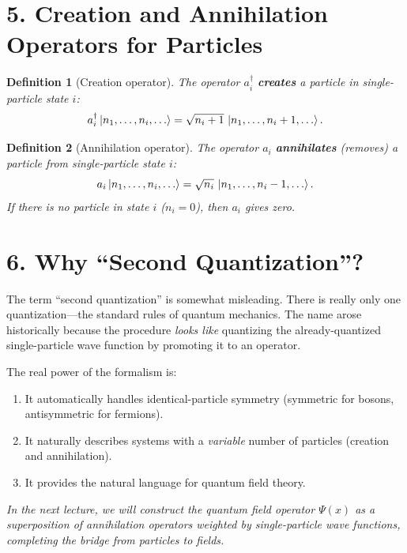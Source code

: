 \documentclass[12pt,a4paper]{article}
\newtheorem{definition}{Definition}
\begin{document}
\section{5. Creation and Annihilation Operators for Particles}

\begin{definition}[Creation operator]
The operator $a_i^\dagger$ \textbf{creates} a particle in single-particle state $i$:
\[
    a_i^\dagger\ket{n_1, \ldots, n_i, \ldots} = \sqrt{n_i + 1}\,\ket{n_1, \ldots, n_i + 1, \ldots}.
\]
\end{definition}

\begin{definition}[Annihilation operator]
The operator $a_i$ \textbf{annihilates} (removes) a particle from single-particle state $i$:
\[
    a_i\ket{n_1, \ldots, n_i, \ldots} = \sqrt{n_i}\,\ket{n_1, \ldots, n_i - 1, \ldots}.
\]
If there is no particle in state $i$ ($n_i = 0$), then $a_i$ gives zero.
\end{definition}

\section{6. Why ``Second Quantization''?}

The term ``second quantization'' is somewhat misleading.  There is really only one quantization---the standard rules of quantum mechanics.  The name arose historically because the procedure \emph{looks like} quantizing the already-quantized single-particle wave function by promoting it to an operator.

\medskip
The real power of the formalism is:
\begin{enumerate}[nosep]
    \item It automatically handles identical-particle symmetry (symmetric for bosons, antisymmetric for fermions).
    \item It naturally describes systems with a \emph{variable} number of particles (creation and annihilation).
    \item It provides the natural language for quantum field theory.
\end{enumerate}

\medskip
\noindent\textit{In the next lecture, we will construct the quantum field operator $\Psi(x)$ as a superposition of annihilation operators weighted by single-particle wave functions, completing the bridge from particles to fields.}
\end{document}
